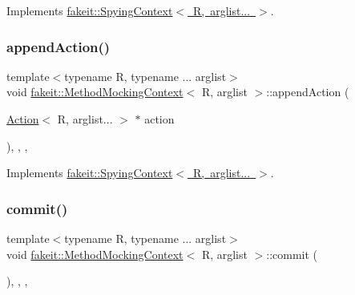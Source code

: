 Implements \mbox{\hyperlink{structfakeit_1_1SpyingContext_ae7eaf07b2bf6a451e5831bfa2769e9c6}{fakeit\+::\+Spying\+Context$<$ R, arglist... $>$}}.

\mbox{\label{classfakeit_1_1MethodMockingContext_ad413d04564c89fe134dfb7bae1a1f2a1}} 
\subsubsection{\texorpdfstring{appendAction()}{appendAction()}\hspace{0.1cm}{\footnotesize\ttfamily [9/9]}}
{\footnotesize\ttfamily template$<$typename R, typename ... arglist$>$ \\
void \mbox{\hyperlink{classfakeit_1_1MethodMockingContext}{fakeit\+::\+Method\+Mocking\+Context}}$<$ R, arglist $>$\+::append\+Action (\begin{DoxyParamCaption}\item[{\mbox{\hyperlink{structfakeit_1_1Action}{Action}}$<$ R, arglist... $>$ $\ast$}]{action }\end{DoxyParamCaption})\hspace{0.3cm}{\ttfamily [inline]}, {\ttfamily [override]}, {\ttfamily [protected]}, {\ttfamily [virtual]}}



Implements \mbox{\hyperlink{structfakeit_1_1SpyingContext_ae7eaf07b2bf6a451e5831bfa2769e9c6}{fakeit\+::\+Spying\+Context$<$ R, arglist... $>$}}.

\mbox{\label{classfakeit_1_1MethodMockingContext_a68a56b3fbd0a2b654a1c72de66e68a71}} 
\subsubsection{\texorpdfstring{commit()}{commit()}\hspace{0.1cm}{\footnotesize\ttfamily [1/9]}}
{\footnotesize\ttfamily template$<$typename R, typename ... arglist$>$ \\
void \mbox{\hyperlink{classfakeit_1_1MethodMockingContext}{fakeit\+::\+Method\+Mocking\+Context}}$<$ R, arglist $>$\+::commit (\begin{DoxyParamCaption}{ }\end{DoxyParamCaption})\hspace{0.3cm}{\ttfamily [inline]}, {\ttfamily [override]}, {\ttfamily [protected]}, {\ttfamily [virtual]}}



